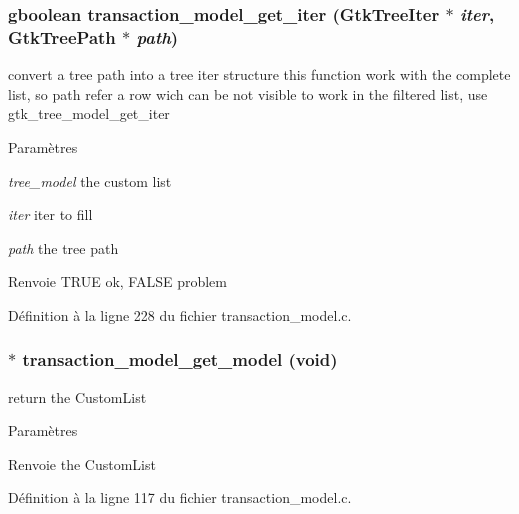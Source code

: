 \subsubsection[{transaction\_\-model\_\-get\_\-iter}]{\setlength{\rightskip}{0pt plus 5cm}gboolean transaction\_\-model\_\-get\_\-iter (GtkTreeIter $\ast$ {\em iter}, \/  GtkTreePath $\ast$ {\em path})}\label{transaction__model_8c_a553ed5bab955a902b0494f0b4521e0fc}
convert a tree path into a tree iter structure this function work with the complete list, so path refer a row wich can be not visible to work in the filtered list, use gtk\_\-tree\_\-model\_\-get\_\-iter


\begin{DoxyParams}{Paramètres}
\item[{\em tree\_\-model}]the custom list \item[{\em iter}]iter to fill \item[{\em path}]the tree path\end{DoxyParams}
\begin{DoxyReturn}{Renvoie}
TRUE ok, FALSE problem 
\end{DoxyReturn}


Définition à la ligne 228 du fichier transaction\_\-model.c.

\subsubsection[{transaction\_\-model\_\-get\_\-model}]{$\ast$ transaction\_\-model\_\-get\_\-model (void)}\label{transaction__model_8c_a416a1ee9231b6f7d74d3b0811902163a}
return the CustomList


\begin{DoxyParams}{Paramètres}
\item[{\em }]\end{DoxyParams}
\begin{DoxyReturn}{Renvoie}
the CustomList 
\end{DoxyReturn}


Définition à la ligne 117 du fichier transaction\_\-model.c.


